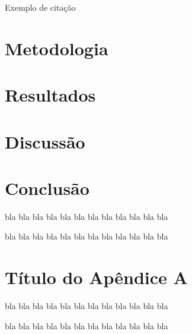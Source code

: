 \documentclass[12pt,a4paper,espaco=umemeio,noindentfirst,oneside,openany,tocpage=plain,pnumromarab,ruledheader,time,anapcustomindent]{abnt}
\begin{document}
Exemplo de citação~\cite{Pressman:2006}


\chapter{Metodologia}


\chapter{Resultados}


\chapter{Discussão}


\chapter{Conclusão}

bla bla bla bla bla bla bla bla bla bla bla bla

bla bla bla bla bla bla bla bla bla bla bla bla







\appendix


\chapter{Título do Apêndice A}

bla bla bla bla bla bla bla bla bla bla bla bla

bla bla bla bla bla bla bla bla bla bla bla bla
\end{document}

